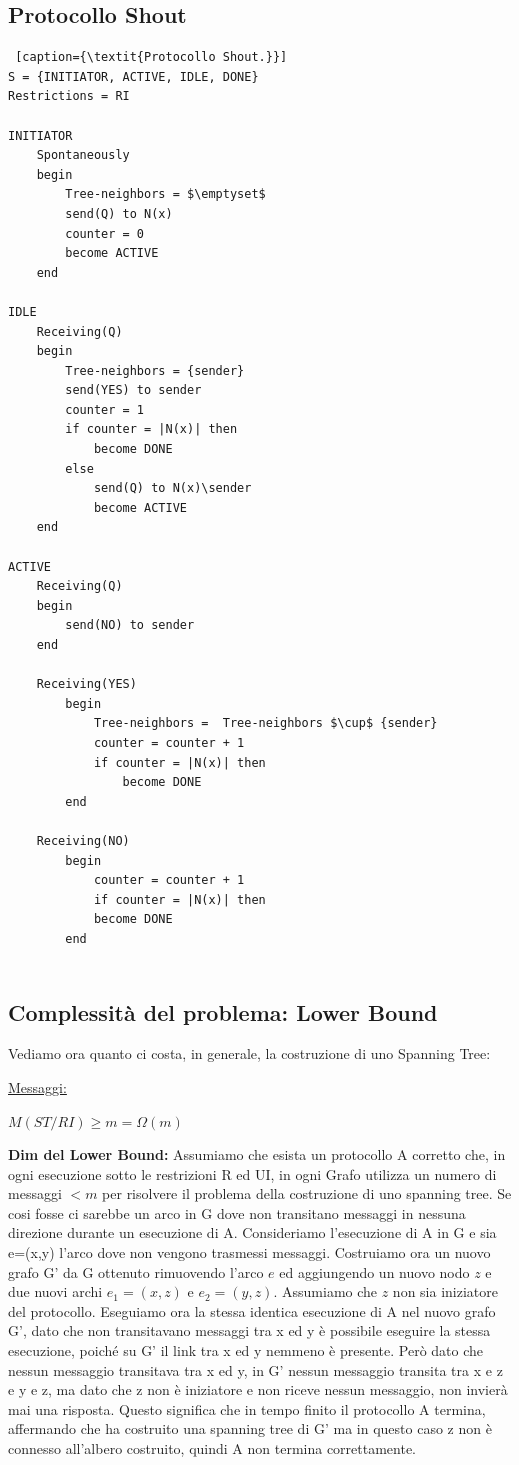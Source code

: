 \subsection{Protocollo Shout}
\begin{lstlisting} [caption={\textit{Protocollo Shout.}}]
S = {INITIATOR, ACTIVE, IDLE, DONE}
Restrictions = RI

INITIATOR 
    Spontaneously
    begin
        Tree-neighbors = $\emptyset$
        send(Q) to N(x)
        counter = 0
        become ACTIVE
    end

IDLE
    Receiving(Q)
    begin
        Tree-neighbors = {sender}
        send(YES) to sender
        counter = 1
        if counter = |N(x)| then
            become DONE
        else
            send(Q) to N(x)\sender
            become ACTIVE
    end

ACTIVE
    Receiving(Q)
    begin
        send(NO) to sender
    end
    
    Receiving(YES)
        begin
            Tree-neighbors =  Tree-neighbors $\cup$ {sender}
            counter = counter + 1
            if counter = |N(x)| then 
                become DONE        
        end
    
    Receiving(NO)
        begin
            counter = counter + 1
            if counter = |N(x)| then
            become DONE
        end
    
\end{lstlisting}

\subsection{Complessità del problema: Lower Bound}
Vediamo ora quanto ci costa, in generale, la costruzione di uno Spanning Tree:

\underline{Messaggi:}
\begin{center}
    $M(ST/RI) \geq m = \Omega(m)$
\end{center}
\textbf{Dim del Lower Bound:}
Assumiamo che esista un protocollo A corretto che, in ogni esecuzione sotto le
restrizioni R ed UI, in ogni Grafo utilizza un numero di messaggi $<m$ per
risolvere il problema della costruzione di uno spanning tree. Se cosi fosse ci
sarebbe un arco in G dove non transitano messaggi in nessuna direzione durante
un esecuzione di A. Consideriamo l'esecuzione di A in G e sia e=(x,y) l'arco
dove non vengono trasmessi messaggi. Costruiamo ora un nuovo grafo G' da G
ottenuto rimuovendo l'arco $e$ ed aggiungendo un nuovo nodo $z$ e due nuovi
archi $e_1=(x,z)$ e $e_2=(y,z)$. Assumiamo che $z$ non sia iniziatore del
protocollo. Eseguiamo ora la stessa identica esecuzione di A nel nuovo grafo G',
dato che non transitavano messaggi tra x ed y è possibile eseguire la stessa
esecuzione, poiché su G' il link tra x ed y nemmeno è presente. Però dato che
nessun messaggio transitava tra x ed y, in G' nessun messaggio transita tra x e
z e y e z, ma dato che z non è iniziatore e non riceve nessun messaggio, non
invierà mai una risposta. Questo significa che in tempo finito il protocollo A
termina, affermando che ha costruito una spanning tree di G' ma in questo caso z
non è connesso all'albero costruito, quindi A non termina correttamente.

